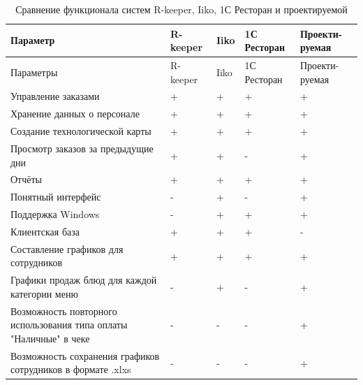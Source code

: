 \begin{xltabular}{\textwidth}{|>{\raggedright\arraybackslash}p{5.5cm}|>{\centering\arraybackslash}X|>{\centering\arraybackslash}X|>{\centering\arraybackslash}X|>{\centering\arraybackslash}X|} 
	\caption{Сравнение функционала систем R-keeper, Iiko, 1С Ресторан и проектируемой\label{systems:table}} \\ \hline
	Параметр & R-keeper & Iiko & 1С Ресторан & Проекти-руемая \\ \hline
	\endfirsthead
	Параметры & R-keeper & Iiko & 1С Ресторан & Проекти-руемая \\ \hline 
	\endhead
	Управление заказами & + & + & + & +  \\ \hline
	Хранение данных о персонале & + & + & + & +  \\ \hline
	Создание технологической карты & + & + & + & +  \\ \hline
	Просмотр заказов за предыдущие дни  & + & + & - & +  \\ \hline
	Отчёты & + & + & + & +  \\ \hline
	Понятный интерфейс & - & + & - & +  \\ \hline
	Поддержка Windows & - & + & + & + \\ \hline
	Клиентская база & + & + & + & -  \\ \hline
	Составление графиков для сотрудников & + & + & + & +   \\ \hline
	Графики продаж блюд для каждой категории меню & - & + & - & +  \\ \hline
	Возможность повторного использования типа оплаты "Наличные" в чеке & - & - & - & + \\ \hline
	Возможность сохранения графиков сотрудников в формате .xlxs & - & - & - & + \\ \hline  
\end{xltabular}
